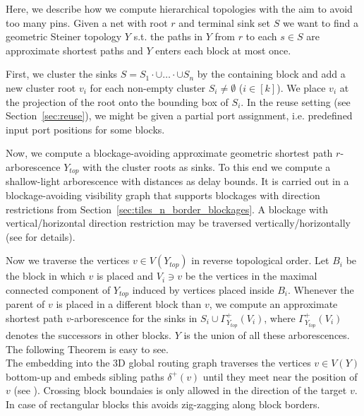 \documentclass[a2paper]{bigsposter}
\begin{document}
\begin{blockrow}[3]
	Here, we describe how we compute hierarchical topologies with the aim to avoid too many pins.
	Given  a net with root $r$ and terminal sink set $S$ we want to find a geometric Steiner topology $Y$ s.t.
	the paths in $Y$ from $r$ to each $s\in S$  are  approximate shortest paths and $Y$ enters each block at most once.
	
	First, we cluster the sinks $S = S_1\cdot{\cup}\dots\cdot{\cup} S_n$ by the containing block and add a new cluster root $v_i$ for each non-empty cluster $S_i \neq\emptyset$ ($i\in [k]$).
	We place  $v_i$ at  the projection of the root onto the bounding box of $S_i$. 
	In the reuse setting (see Section~\ref{sec:reuse}), we might be given a partial port assignment, i.e. predefined input port positions for some blocks. %
	
	
	Now, we compute a  blockage-avoiding approximate geometric shortest path $r$-arborescence $Y_{top}$ with the cluster roots as sinks.
	To this end we compute a shallow-light arborescence \cite{ShallowLight} with distances as delay bounds.
	It is carried out in a  blockage-avoiding visibility graph that supports blockages with direction restrictions from Section~\ref{sec:tiles_n_border_blockages}.
	A blockage with vertical/horizontal direction restriction may be traversed vertically/horizontally (see \cite{bihler-dissertation} for details).
	
	Now we traverse the vertices $v\in V(Y_{top})$ in reverse topological order.
	Let $B_i$ be the block in which $v$ is placed and $V_i\ni v$ be the vertices in the maximal connected component of $Y_{top}$ induced by vertices placed inside $B_i$.
	Whenever the parent of $v$ is placed in a different block than $v$, we compute an approximate shortest path $v$-arborescence for the  sinks in $S_i \cup \Gamma_{Y_{top}}^+(V_i)$,
	where $\Gamma_{Y_{top}}^+(V_i)$ denotes the successors in other blocks.
	$Y$ is the union of all these arborescences. The following Theorem is easy to see.\\
	
	The embedding into the 3D global routing graph traverses the vertices $v\in V(Y)$  bottom-up and embeds sibling paths $\delta^+(v)$
	until they meet near the position of $v$ (see \cite{BRGTiming2}).
	Crossing  block boundaies is only allowed in the direction of the target $v$.
	In case of rectangular blocks this avoids zig-zagging along block borders.\\
\end{blockrow}
\end{document}
